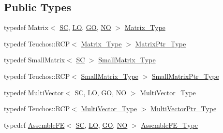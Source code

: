 \subsection*{Public Types}
\begin{DoxyCompactItemize}
\item 
typedef Matrix$<$ \hyperlink{fe__test__laplace_8cpp_a79c7e86a57edbb2a5a53242bcd04e41e}{SC}, \hyperlink{fe__test__laplace_8cpp_ad6a38c9f07d3fd633eefca5bccad8410}{LO}, \hyperlink{fe__test__laplace_8cpp_afa2946b509009b4f45eb04bd8c5b27d9}{GO}, \hyperlink{fe__test__laplace_8cpp_a5e24f37b28787429872b6ecb1d0417ce}{NO} $>$ \hyperlink{classFEDD_1_1AssembleFEAceNavierStokes_a077bd68fc7a8d900e2a2407dd1265244}{Matrix\+\_\+\+Type}
\item 
typedef Teuchos\+::\+R\+CP$<$ \hyperlink{classFEDD_1_1AssembleFEAceNavierStokes_a077bd68fc7a8d900e2a2407dd1265244}{Matrix\+\_\+\+Type} $>$ \hyperlink{classFEDD_1_1AssembleFEAceNavierStokes_aea5985e9fd4e072a47d8223c6c5f81c0}{Matrix\+Ptr\+\_\+\+Type}
\item 
typedef Small\+Matrix$<$ \hyperlink{fe__test__laplace_8cpp_a79c7e86a57edbb2a5a53242bcd04e41e}{SC} $>$ \hyperlink{classFEDD_1_1AssembleFEAceNavierStokes_a12c4d652d692956a7839abbf4c02b26a}{Small\+Matrix\+\_\+\+Type}
\item 
typedef Teuchos\+::\+R\+CP$<$ \hyperlink{classFEDD_1_1AssembleFE_a8b8c588ba0cfaa200a74215f19e62722}{Small\+Matrix\+\_\+\+Type} $>$ \hyperlink{classFEDD_1_1AssembleFEAceNavierStokes_a327b281cceb65293a78e87c0c39facc7}{Small\+Matrix\+Ptr\+\_\+\+Type}
\item 
typedef Multi\+Vector$<$ \hyperlink{fe__test__laplace_8cpp_a79c7e86a57edbb2a5a53242bcd04e41e}{SC}, \hyperlink{fe__test__laplace_8cpp_ad6a38c9f07d3fd633eefca5bccad8410}{LO}, \hyperlink{fe__test__laplace_8cpp_afa2946b509009b4f45eb04bd8c5b27d9}{GO}, \hyperlink{fe__test__laplace_8cpp_a5e24f37b28787429872b6ecb1d0417ce}{NO} $>$ \hyperlink{classFEDD_1_1AssembleFEAceNavierStokes_ae3b75de049d1afb35bd03a81d19f4f5a}{Multi\+Vector\+\_\+\+Type}
\item 
typedef Teuchos\+::\+R\+CP$<$ \hyperlink{classFEDD_1_1AssembleFEAceNavierStokes_ae3b75de049d1afb35bd03a81d19f4f5a}{Multi\+Vector\+\_\+\+Type} $>$ \hyperlink{classFEDD_1_1AssembleFEAceNavierStokes_a92495c4e2a54273636a81a594413382a}{Multi\+Vector\+Ptr\+\_\+\+Type}
\item 
typedef \hyperlink{classFEDD_1_1AssembleFE}{Assemble\+FE}$<$ \hyperlink{fe__test__laplace_8cpp_a79c7e86a57edbb2a5a53242bcd04e41e}{SC}, \hyperlink{fe__test__laplace_8cpp_ad6a38c9f07d3fd633eefca5bccad8410}{LO}, \hyperlink{fe__test__laplace_8cpp_afa2946b509009b4f45eb04bd8c5b27d9}{GO}, \hyperlink{fe__test__laplace_8cpp_a5e24f37b28787429872b6ecb1d0417ce}{NO} $>$ \hyperlink{classFEDD_1_1AssembleFEAceNavierStokes_adeb960c158fe3fb391238331add6f26f}{Assemble\+F\+E\+\_\+\+Type}
\end{DoxyCompactItemize}
